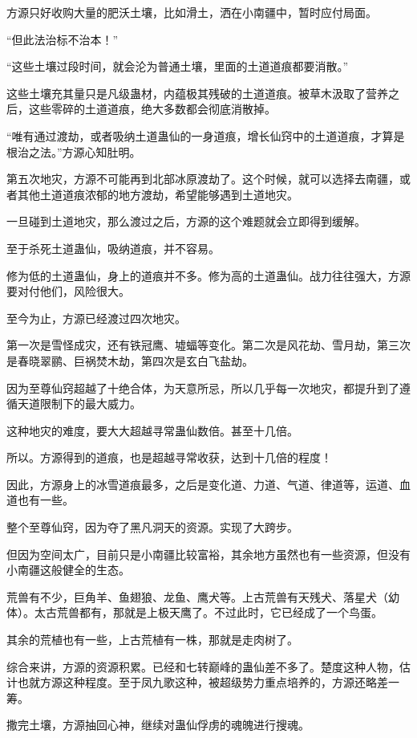 \begin{this_body}
方源只好收购大量的肥沃土壤，比如滑土，洒在小南疆中，暂时应付局面。

“但此法治标不治本！”

“这些土壤过段时间，就会沦为普通土壤，里面的土道道痕都要消散。”

这些土壤充其量只是凡级蛊材，内蕴极其残破的土道道痕。被草木汲取了营养之后，这些零碎的土道道痕，绝大多数都会彻底消散掉。

“唯有通过渡劫，或者吸纳土道蛊仙的一身道痕，增长仙窍中的土道道痕，才算是根治之法。”方源心知肚明。

第五次地灾，方源不可能再到北部冰原渡劫了。这个时候，就可以选择去南疆，或者其他土道道痕浓郁的地方渡劫，希望能够遇到土道地灾。

一旦碰到土道地灾，那么渡过之后，方源的这个难题就会立即得到缓解。

至于杀死土道蛊仙，吸纳道痕，并不容易。

修为低的土道蛊仙，身上的道痕并不多。修为高的土道蛊仙。战力往往强大，方源要对付他们，风险很大。

至今为止，方源已经渡过四次地灾。

第一次是雪怪成灾，还有铁冠鹰、墟蝠等变化。第二次是风花劫、雪月劫，第三次是春晓翠鹂、巨祸焚木劫，第四次是玄白飞盐劫。

因为至尊仙窍超越了十绝合体，为天意所忌，所以几乎每一次地灾，都提升到了遵循天道限制下的最大威力。

这种地灾的难度，要大大超越寻常蛊仙数倍。甚至十几倍。

所以。方源得到的道痕，也是超越寻常收获，达到十几倍的程度！

因此，方源身上的冰雪道痕最多，之后是变化道、力道、气道、律道等，运道、血道也有一些。

整个至尊仙窍，因为夺了黑凡洞天的资源。实现了大跨步。

但因为空间太广，目前只是小南疆比较富裕，其余地方虽然也有一些资源，但没有小南疆这般健全的生态。

荒兽有不少，巨角羊、鱼翅狼、龙鱼、鹰犬等。上古荒兽有天残犬、落星犬（幼体）。太古荒兽都有，那就是上极天鹰了。不过此时，它已经成了一个鸟蛋。

其余的荒植也有一些，上古荒植有一株，那就是走肉树了。

综合来讲，方源的资源积累。已经和七转巅峰的蛊仙差不多了。楚度这种人物，估计也就方源这种程度。至于凤九歌这种，被超级势力重点培养的，方源还略差一筹。

撒完土壤，方源抽回心神，继续对蛊仙俘虏的魂魄进行搜魂。


\end{this_body}
